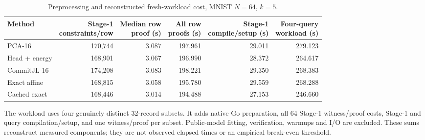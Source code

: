 \begin{table}[tp]
\caption{Preprocessing and reconstructed fresh-workload cost, MNIST $N=64$, $k=5$.}\label{tab:preprocessing}
\centering\small
\begin{adjustbox}{max width=\textwidth}
\begin{tabular}{@{}lrrrrr@{}}
\toprule
Method & \shortstack{Stage-1\\constraints/row} & \shortstack{Median row\\proof (s)} & \shortstack{All row\\proofs (s)} & \shortstack{Stage-1\\compile/setup (s)} & \shortstack{Four-query\\workload (s)} \\
\midrule
PCA-16 & 170,744 & 3.087 & 197.961 & 29.011 & 279.123 \\
Head + energy & 168,901 & 3.067 & 196.990 & 28.372 & 264.617 \\
CommitJL-16 & 174,208 & 3.083 & 198.221 & 29.350 & 268.383 \\
Exact affine & 168,815 & 3.058 & 195.780 & 29.559 & 268.288 \\
Cached exact & 168,446 & 3.014 & 194.488 & 27.153 & 246.660 \\
\bottomrule
\end{tabular}
\end{adjustbox}
\par\vspace{3pt}\begin{minipage}{0.98\textwidth}\footnotesize The workload uses four genuinely distinct 32-record subsets. It adds native Go preparation, all 64 Stage-1 witness/proof costs, Stage-1 and query compilation/setup, and one witness/proof per subset. Public-model fitting, verification, warmups and I/O are excluded. These sums reconstruct measured components; they are not observed elapsed times or an empirical break-even threshold.\end{minipage}
\end{table}
